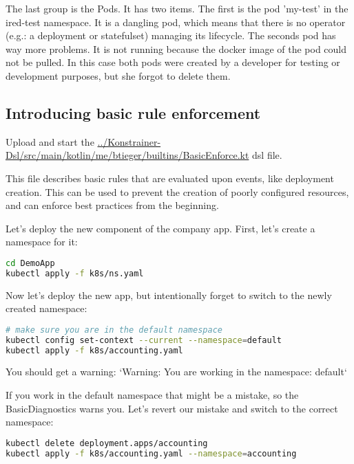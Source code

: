 The last group is the Pods. It has two items. The first is the pod 'my-test' in the ired-test namespace. It is a dangling pod, which means that there is no operator (e.g.: a deployment or statefulset) managing its lifecycle. The seconds pod has way more problems. It is not running because the docker image of the pod could not be pulled. In this case both pods were created by a developer for testing or development purposes, but she forgot to delete them.

\subsection{Introducing basic rule enforcement}

Upload and start the \url{../Konstrainer-Dsl/src/main/kotlin/me/btieger/builtins/BasicEnforce.kt} dsl file.

This file describes basic rules that are evaluated upon events, like deployment creation. This can be used to prevent the creation of poorly configured resources, and can enforce best practices from the beginning.

Let's deploy the new component of the company app. First, let's create a namespace for it:

\begin{lstlisting}[caption={TODO},language=bash,label=code:bashx]
cd DemoApp
kubectl apply -f k8s/ns.yaml
\end{lstlisting}

Now let's deploy the new app, but intentionally forget to switch to the newly created namespace:

\begin{lstlisting}[caption={TODO},language=bash,label=code:bashx]
# make sure you are in the default namespace
kubectl config set-context --current --namespace=default
kubectl apply -f k8s/accounting.yaml
\end{lstlisting}

You should get a warning: `Warning: You are working in the namespace: default`

If you work in the default namespace that might be a mistake, so the BasicDiagnostics warns you. Let's revert our mistake and switch to the correct namespace:

\begin{lstlisting}[caption={TODO},language=bash,label=code:bashx]
kubectl delete deployment.apps/accounting
kubectl apply -f k8s/accounting.yaml --namespace=accounting
\end{lstlisting}

